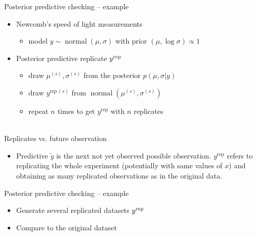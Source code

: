 \documentclass[t]{beamer}
\DeclareMathOperator{\normal}{normal}
\begin{document}
\begin{frame}{Posterior predictive checking -- example}

  \begin{itemize}
  \item<1-> Newcomb's speed of light measurements
    \begin{itemize}
    \item model $y\sim\normal(\mu,\sigma)$ with prior $(\mu,\log\sigma)\propto 1$
    \end{itemize}
  \item<2-> Posterior predictive replicate $y^{\rm rep}$
    \begin{itemize}
    \item<3-> draw $\mu^{(s)},\sigma^{(s)}$ from the posterior $p(\mu,\sigma|y)$
    \item<4-> draw $y^{\mathrm{rep}\,(s)}$ from $\normal(\mu^{(s)},\sigma^{(s)})$
    \item<5-> repeat $n$ times to get $y^{\mathrm{rep}}$ with $n$ replicates\\~\\
      \end{itemize}
    \end{itemize}

\end{frame}

\begin{frame}{Replicates vs. future observation}

  \begin{itemize}
  \item Predictive $\tilde{y}$ is the next not yet observed possible
    observation. $y^{\mathrm{rep}}$ refers to replicating the whole
    experiment (potentially with same values of $x$) and obtaining as
    many replicated observations as in the original data.
  \end{itemize}

\end{frame}

\begin{frame}{Posterior predictive checking -- example}

  \begin{itemize}
  \item<1-> Generate several replicated datasets $y^{\rm rep}$
  \item<2-> Compare to the original dataset
  \end{itemize}
  \vspace{-1\baselineskip}

\end{frame}
\end{document}
